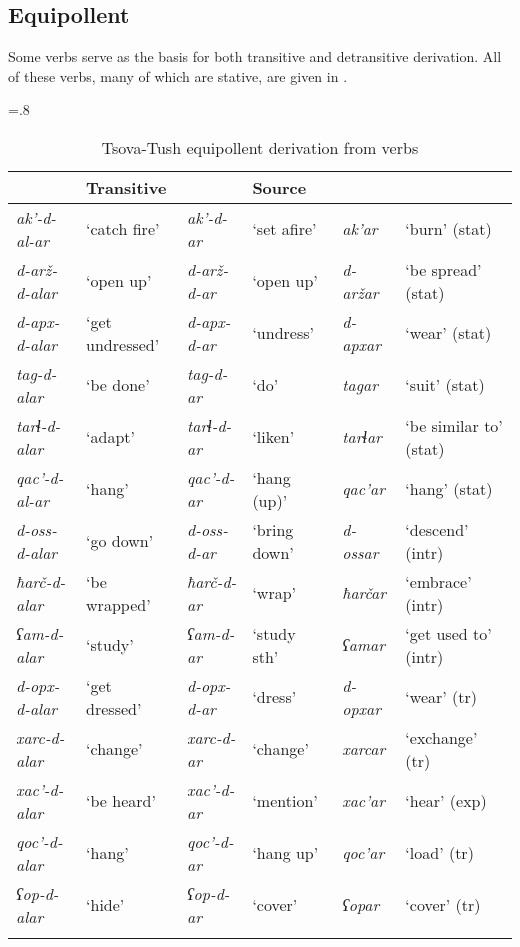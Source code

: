 \subsection{Equipollent} \label{equi}

Some verbs serve as the basis for both transitive and detransitive derivation. All of these verbs, many of which are stative, are given in .

\begin{table}
	\small
	\tabcolsep=.8\tabcolsep
	\begin{tabular}{ *3{ l@{~} l} }
		\lsptoprule
		\multicolumn{2}{l}{Intransitive} & \multicolumn{2}{l}{Transitive} & \multicolumn{2}{l}{Source} \\
		\midrule
		\textit{ak'-d-al-ar} & `catch fire' & \textit{ak'-d-ar} & `set afire' & \textit{ak'ar} & `burn' (stat) \\
		\textit{d-arž-d-alar} &	`open up' &	\textit{d-arž-d-ar} &	`open up' &	\textit{d-aržar} &	`be spread' (stat) \\
		\textit{d-apx-d-alar} &	`get undressed' &	\textit{d-apx-d-ar} &	`undress' &	\textit{d-apxar} &	`wear' (stat) \\
		\textit{tag-d-alar} & `be done' &	\textit{tag-d-ar} &	`do' & \textit{tagar} & `suit' (stat) \\
		\textit{tarɬ-d-alar} &	`adapt' & \textit{tarɬ-d-ar} &	`liken' & \textit{tarɬar} &	`be similar to' (stat) \\
		\textit{qac'-d-al-ar} & `hang' & \textit{qac'-d-ar} & `hang (up)' & \textit{qac'ar} & `hang' (stat) \\
		\midrule
		
		\textit{d-oss-d-alar} & `go down' & \textit{d-oss-d-ar} & `bring down' & \textit{d-ossar} & `descend' (intr) \\
		\textit{ħarč-d-alar} & `be wrapped' & \textit{ħarč-d-ar} & `wrap' & \textit{ħarčar} & `embrace' (intr) \\
		\textit{ʕam-d-alar} & `study' & \textit{ʕam-d-ar} & `study sth'& \textit{ʕamar} & `get used to' (intr) \\
		
		\midrule
		
		\textit{d-opx-d-alar} & `get dressed' & \textit{d-opx-d-ar} & `dress' & \textit{d-opxar} & `wear' (tr) \\
		\textit{xarc-d-alar} & `change' & \textit{xarc-d-ar} & `change' & \textit{xarcar} & `exchange' (tr) \\
		\textit{xac'-d-alar} & `be heard' & \textit{xac'-d-ar} & `mention' & \textit{xac'ar} & `hear' (exp) \\
		\textit{qoc'-d-alar} & `hang' & \textit{qoc'-d-ar} & `hang up' & \textit{qoc'ar} & `load' (tr) \\
		\textit{ʕop-d-alar} & `hide' & \textit{ʕop-d-ar} & `cover' & \textit{ʕopar} & `cover' (tr) \\
		
		\lspbottomrule
	\end{tabular}
\caption{Tsova-Tush equipollent derivation from verbs}
\label{verbderiv-table8}
\end{table}
